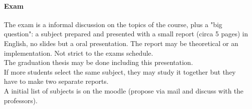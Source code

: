 \documentclass[10pt]{report}
\begin{document}
\paragraph{Exam} The exam is a informal discussion on the topics of the course, plus a "big question": a subject prepared and presented with a small report (circa 5 pages) in English, no slides but a oral presentation. The report may be theoretical or an implementation. Not strict to the exams schedule.\\
The graduation thesis may be done including this presentation.\\
If more students select the same subject, they may study it together but they have to make two separate reports.\\
A initial list of subjects is on the moodle (propose via mail and discuss with the professors).
\end{document}
